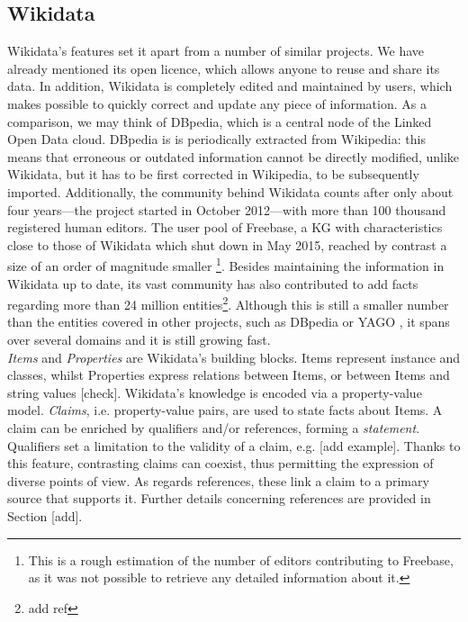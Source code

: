\documentclass{llncs}
\begin{document}
\subsection{Wikidata}
Wikidata's features set it apart from a number of similar projects. We have already mentioned its open licence, which allows anyone to reuse and share its data. In addition, Wikidata is completely edited and maintained by users, which makes possible to quickly correct and update any piece of information. As a comparison, we may think of DBpedia, which is a central node of the Linked Open Data cloud. DBpedia is is periodically extracted from Wikipedia: this means that erroneous or outdated information cannot be directly modified, unlike Wikidata, but it has to be first corrected in Wikipedia, to be subsequently imported. Additionally, the community behind Wikidata counts after only about four years---the project started in October 2012---with more than 100 thousand registered human editors. The user pool of Freebase, a KG with characteristics close to those of Wikidata which shut down in May 2015, reached by contrast a size of an order of magnitude smaller \cite{farber2015comparative}\footnote{This is a rough estimation of the number of editors contributing to Freebase, as it was not possible to retrieve any detailed information about it.}.  Besides maintaining the information in Wikidata up to date, its vast community has also contributed to add facts regarding more than 24 million entities\footnote{add ref}. Although this is still a smaller number than the entities covered in other projects, such as DBpedia or YAGO \cite{farber_stats}, it spans over several domains and it is still growing fast.\\
\textit{Items} and \textit{Properties} are Wikidata's building blocks. Items represent instance and classes, whilst Properties express relations between Items, or between Items and string values [check]. Wikidata's knowledge is encoded via a property-value model. \textit{Claims}, i.e. property-value pairs, are used to state facts about Items. A claim can be enriched by qualifiers and/or references, forming a \textit{statement}. Qualifiers set a limitation to the validity of a claim, e.g. [add example]. Thanks to this feature, contrasting claims can coexist, thus permitting the expression of diverse points of view. As regards references, these link a claim to a primary source that supports it. Further details concerning references are provided in Section [add]. 
\end{document}
